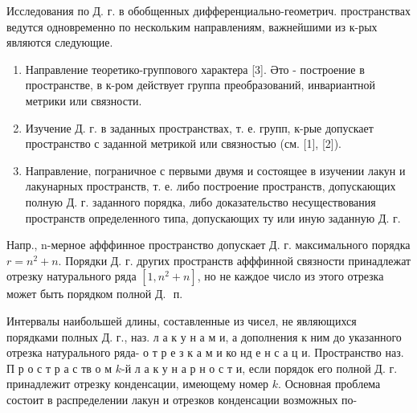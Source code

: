 \documentclass[10pt]{article}
\begin{document}
Исследования по Д. г. в обобщенных дифференциально-геометрич. пространствах ведутся одновременно по нескольким направлениям, важнейшими из к-рых являются следующие.



\begin{enumerate}

  \item Направление теоретико-группового характера [3]. Әто - построение в пространстве, в к-ром действует группа преобразований, инвариантной метрики или связности.



  \item Изучение Д. г. в заданных пространствах, т. е. групп, к-рые допускает пространство с заданной метрикой или связностью (см. [1], [2]).



  \item Направление, пограничное с первыми двумя и состоящее в изучении лакун и лакунарных пространств, т. е. либо построение пространств, допускающих полную Д. г. заданного порядка, либо доказательство несуществования пространств определенного типа, допускающих ту или иную заданную Д. г.



\end{enumerate}



Напр., n-мерное афффинное пространство допускает Д. г. максимального порядка $r=n^{2}+n$. Порядки Д. г. других пространств афффинной связности принадлежат отрезку натурального ряда $\left[1, n^{2}+n\right]$, но не каждое число из этого отрезка может быть порядком полной Д. $\boldsymbol{\text { п. }}$



Интервалы наибольшей длины, составленные из чисел, не являющихся порядками полных Д. г., наз. л а к у н а м и, а дополнения к ним до указанного отрезка натурального ряда- о т р е з к а м и ко нд е н с а ц и. Пространство наз. П р о с т р а с тв о м $k$-й л а к у н а р н о с т и, если порядок его полной Д. г. принадлежит отрезку конденсации, имеющему номер $k$. Основная проблема состоит в распределении лакун и отрезков конденсации возможных по-
\end{document}
